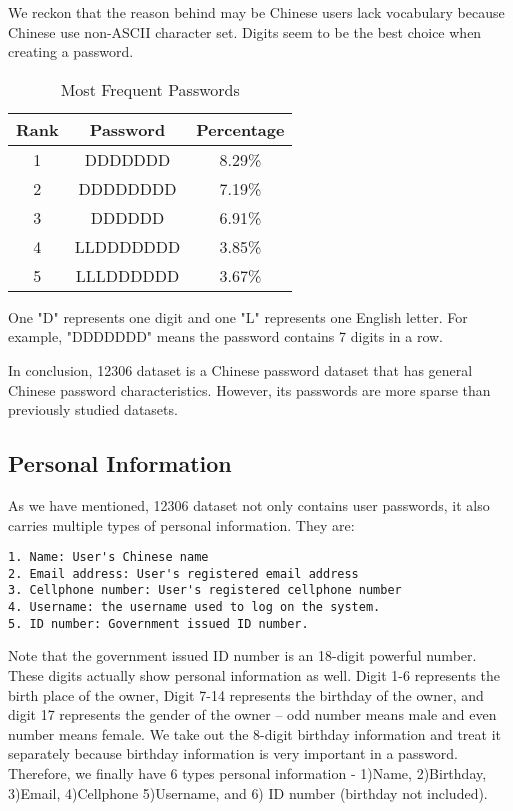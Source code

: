 \documentclass{sig-alternate}
\begin{document}
We reckon that the reason behind may be Chinese users lack vocabulary because Chinese use non-ASCII character set. Digits seem to be the best choice when creating a password.

\begin{table}
\centering
\caption{Most Frequent Passwords}
\begin{tabular}{|c|c|c|} \hline
Rank&Password&Percentage\\ \hline
1&DDDDDDD&8.29\%\\ \hline
2&DDDDDDDD&7.19\%\\ \hline
3&DDDDDD&6.91\%\\ \hline
4&LLDDDDDDD&3.85\%\\ \hline
5&LLLDDDDDD&3.67\%\\
\hline\end{tabular}

\begin{tablenotes}
      \small
      \item One "D" represents one digit and one "L" represents one English letter. For example, "DDDDDDD" means the password contains 7 digits in a row.
    \end{tablenotes}
\label{t2}
\end{table}

In conclusion, 12306 dataset is a Chinese password dataset that has general Chinese password characteristics. However, its passwords are more sparse than previously studied datasets. 

\subsection{Personal Information}
As we have mentioned, 12306 dataset not only contains user passwords, it also carries multiple types of personal information. They are:

\begin{verbatim}
1. Name: User's Chinese name
2. Email address: User's registered email address
3. Cellphone number: User's registered cellphone number
4. Username: the username used to log on the system.
5. ID number: Government issued ID number.
\end{verbatim}

Note that the government issued ID number is an 18-digit powerful number. These digits actually show personal information as well. Digit 1-6 represents the birth place of the owner, Digit 7-14 represents the birthday of the owner, and digit 17 represents the gender of the owner -- odd number means male and even number means female. We take out the 8-digit birthday information and treat it separately because birthday information is very important in a password. Therefore, we finally have 6 types personal information - 1)Name, 2)Birthday, 3)Email, 4)Cellphone 5)Username, and 6) ID number (birthday not included). 
\end{document}
